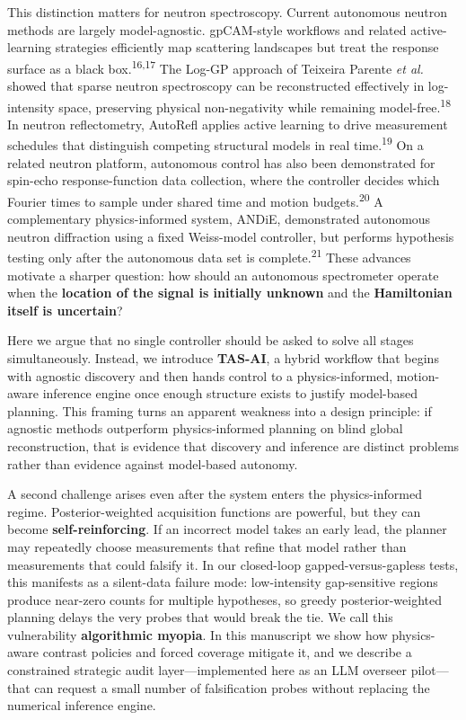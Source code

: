 \documentclass[
]{article}
\begin{document}
This distinction matters for neutron spectroscopy. Current autonomous
neutron methods are largely model-agnostic. gpCAM-style workflows and
related active-learning strategies efficiently map scattering landscapes
but treat the response surface as a black box.\textsuperscript{16,17}
The Log-GP approach of Teixeira Parente \emph{et al.} showed that sparse
neutron spectroscopy can be reconstructed effectively in log-intensity
space, preserving physical non-negativity while remaining
model-free.\textsuperscript{18} In neutron reflectometry, AutoRefl
applies active learning to drive measurement schedules that distinguish
competing structural models in real time.\textsuperscript{19} On a
related neutron platform, autonomous control has also been demonstrated
for spin-echo response-function data collection, where the controller
decides which Fourier times to sample under shared time and motion
budgets.\textsuperscript{20} A complementary physics-informed system,
ANDiE, demonstrated autonomous neutron diffraction using a fixed
Weiss-model controller, but performs hypothesis testing only after the
autonomous data set is complete.\textsuperscript{21} These advances
motivate a sharper question: how should an autonomous spectrometer
operate when the \textbf{location of the signal is initially unknown}
and the \textbf{Hamiltonian itself is uncertain}?

Here we argue that no single controller should be asked to solve all
stages simultaneously. Instead, we introduce \textbf{TAS-AI}, a hybrid
workflow that begins with agnostic discovery and then hands control to a
physics-informed, motion-aware inference engine once enough structure
exists to justify model-based planning. This framing turns an apparent
weakness into a design principle: if agnostic methods outperform
physics-informed planning on blind global reconstruction, that is
evidence that discovery and inference are distinct problems rather than
evidence against model-based autonomy.

A second challenge arises even after the system enters the
physics-informed regime. Posterior-weighted acquisition functions are
powerful, but they can become \textbf{self-reinforcing}. If an incorrect
model takes an early lead, the planner may repeatedly choose
measurements that refine that model rather than measurements that could
falsify it. In our closed-loop gapped-versus-gapless tests, this
manifests as a silent-data failure mode: low-intensity gap-sensitive
regions produce near-zero counts for multiple hypotheses, so greedy
posterior-weighted planning delays the very probes that would break the
tie. We call this vulnerability \textbf{algorithmic myopia}. In this
manuscript we show how physics-aware contrast policies and forced
coverage mitigate it, and we describe a constrained strategic audit
layer---implemented here as an LLM overseer pilot---that can request a
small number of falsification probes without replacing the numerical
inference engine.
\end{document}
